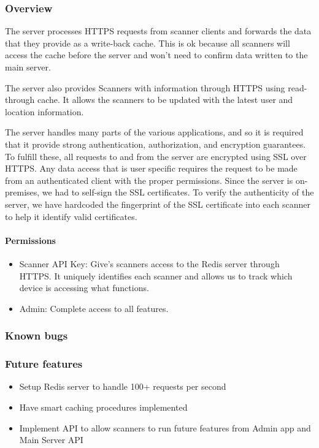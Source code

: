 \documentclass[twoside, 12pt]{article}
\newenvironment{tightitemize} %
{\begin{itemize}\itemsep1pt \parskip0pt \parsep0pt}
{\end{itemize}\vspace{-\topsep}}
\begin{document}
\subsubsection{Overview}
\par The server processes HTTPS requests from scanner clients and forwards the data that they provide as a write-back cache. This is ok because all scanners will access the cache before the server and won’t need to confirm data written to the main server.
\par The server also provides Scanners with information through HTTPS using read-through cache. It allows the scanners to be updated with the latest user and location information.
\par The server handles many parts of the various applications, and so it is required that it provide strong authentication, authorization, and encryption guarantees. To fulfill these, all requests to and from the server are encrypted using SSL over HTTPS. Any data access that is user specific requires the request to be made from an authenticated client with the proper permissions. Since the server is on-premises, we had to self-sign the SSL certificates. To verify the authenticity of the server, we have hardcoded the fingerprint of the SSL certificate into each scanner to help it identify valid certificates.
\paragraph{Permissions}
\begin{tightitemize}
    \item Scanner API Key: Give’s scanners access to the Redis server through HTTPS. It uniquely identifies each scanner and allows us to track which device is accessing what functions.
    \item Admin: Complete access to all features.
\end{tightitemize}
\subsubsection{Known bugs}
\subsubsection{Future features}
\begin{tightitemize}
    \item Setup Redis server to handle 100+ requests per second
    \item Have smart caching procedures implemented
    \item Implement API to allow scanners to run future features from Admin app and Main Server API
\end{tightitemize}
\newpage
\end{document}
